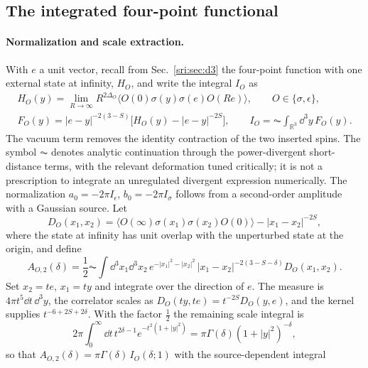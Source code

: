 \subsection{The integrated four-point functional}\label{sri:app:cone:functional}
\paragraph{Normalization and scale extraction.} With $e$ a unit vector, recall from Sec.~\ref{sri:sec:d3} the
four-point function with one external state at infinity, $H_O$, and write the integral $I_O$ as
\begin{equation}
\begin{gathered}
 H_O(y)=\lim_{R\to\infty}R^{2\Delta_O}\langle O(0)\sigma(y)\sigma(e)O(Re)\rangle,\qquad O\in\{\sigma,\epsilon\},\\
 F_O(y)=|e-y|^{-2(3-S)}\bigl[H_O(y)-|e-y|^{-2S}\bigr],\qquad I_O=\AC\!\int_{\mathbb R^3}\dd^3y\,F_O(y).
\end{gathered}
 \label{sri:eq:cone:FO}
\end{equation}
The vacuum term removes the identity contraction of the two inserted spins. The symbol $\AC$ denotes analytic
continuation through the power-divergent short-distance terms, with the relevant deformation tuned critically; it is not
a prescription to integrate an unregulated divergent expression numerically. The normalization
$a_0=-2\pi I_\epsilon$, $b_0=-2\pi I_\sigma$ follows from a second-order amplitude with a Gaussian source. Let
\begin{equation}
 D_O(x_1,x_2)=\langle O(\infty)\sigma(x_1)\sigma(x_2)O(0)\rangle-|x_1-x_2|^{-2S},
\end{equation}
where the state at infinity has unit overlap with the unperturbed state at the origin, and define
\begin{equation}
 A_{O,2}(\delta)=\frac12\AC\!\int\dd^3x_1\dd^3x_2\,e^{-|x_1|^2-|x_2|^2}\,|x_1-x_2|^{-2(3-S-\delta)}D_O(x_1,x_2).
 \label{sri:eq:cone:A2}
\end{equation}
Set $x_2=te$, $x_1=ty$ and integrate over the direction of $e$. The measure is $4\pi t^5\dd t\,\dd^3y$, the correlator
scales as $D_O(ty,te)=t^{-2S}D_O(y,e)$, and the kernel supplies $t^{-6+2S+2\delta}$. With the factor $\frac12$ the
remaining scale integral is
\begin{equation}
 2\pi\int_0^\infty\dd t\,t^{2\delta-1}e^{-t^2(1+|y|^2)}=\pi\Gamma(\delta)(1+|y|^2)^{-\delta},
\end{equation}
so that $A_{O,2}(\delta)=\pi\Gamma(\delta)\,I_O(\delta;1)$ with the source-dependent integral
